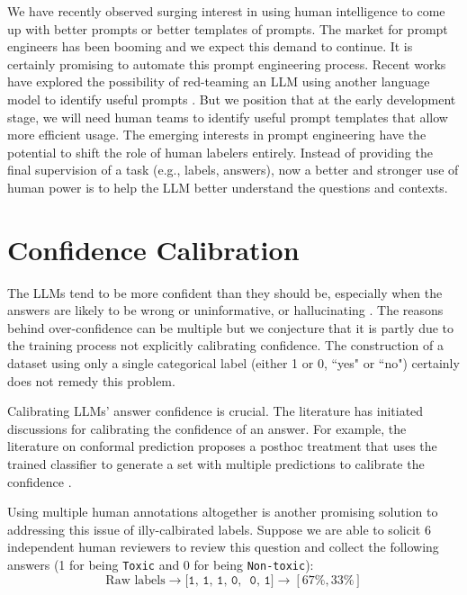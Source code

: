 \documentclass{article}
\begin{document}
We have recently observed surging interest in using human intelligence to come up with better prompts or better templates of prompts. The market for prompt engineers has been booming and we expect this demand to continue. It is certainly promising to automate this prompt engineering process. 
Recent works have explored the possibility of red-teaming an LLM using another language model to identify useful prompts \cite{perez2022red}. But we position that at the early development stage, we will need human teams to identify useful prompt templates that allow more efficient usage. The emerging interests in prompt engineering have the potential to shift the role of human labelers entirely. Instead of providing the final supervision of a task (e.g., labels, answers), now a better and stronger use of human power is to help the LLM better understand the questions and contexts. 


\section{Confidence Calibration}

 
The LLMs tend to be more confident than they should be, especially when the answers are likely to be wrong or uninformative, or hallucinating \cite{gpt4}. 
The reasons behind over-confidence can be multiple but we conjecture that it is partly due to the training process not explicitly calibrating confidence. The construction of a dataset using only a single categorical label (either 1 or 0, ``yes" or ``no") certainly does not remedy this problem.  

Calibrating LLMs' answer confidence is crucial. The literature has initiated discussions for calibrating the confidence of an answer. For example, the literature on conformal prediction proposes a posthoc treatment that uses the trained classifier to generate a set with multiple predictions to calibrate the confidence \cite{shafer2008tutorial}. 

Using multiple human annotations altogether is another promising solution to addressing this issue of illy-calbirated labels.
Suppose we are able to solicit 6 independent human reviewers to review this question and collect the following answers (1 for being \texttt{Toxic} and 0 for being \texttt{Non-toxic}):
\[
\text{Raw labels} \rightarrow \texttt{[1,~1,~1,~0, ~0,~1]} \rightarrow [67\%, 33\%]
\]
\end{document}
